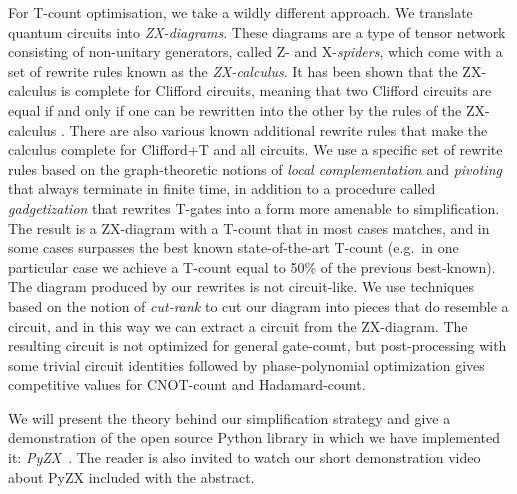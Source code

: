\documentclass[a4paper,11pt]{article}
\begin{document}
For T-count optimisation, we take a wildly different approach. We translate quantum circuits into \emph{ZX-diagrams}. These diagrams are a type of tensor network consisting of non-unitary generators, called Z- and X-\emph{spiders}, which come with a set of rewrite rules known as the \emph{ZX-calculus}. It has been shown that the ZX-calculus is complete for Clifford circuits, meaning that two Clifford circuits are equal if and only if one can be rewritten into the other by the rules of the ZX-calculus \cite{backens2016simplified}. There are also various known additional rewrite rules that make the calculus complete for Clifford+T \cite{jeandel2018complete} and all \cite{HarnyAmarCompleteness} circuits. We use a specific set of rewrite rules based on the graph-theoretic notions of \emph{local complementation} and \emph{pivoting} that always terminate in finite time, in addition to a procedure called \emph{gadgetization} that rewrites T-gates into a form more amenable to simplification. The result is a ZX-diagram with a T-count that in most cases matches, and in some cases surpasses the best known state-of-the-art T-count (e.g.~in one particular case we achieve a T-count equal to 50\% of the previous best-known). The diagram produced by our rewrites is not circuit-like. We use techniques based on the notion of \emph{cut-rank} to cut our diagram into pieces that do resemble a circuit, and in this way we can extract a circuit from the ZX-diagram. The resulting circuit is not optimized for general gate-count, but post-processing with some trivial circuit identities followed by phase-polynomial optimization gives competitive values for CNOT-count and Hadamard-count.

We will present the theory behind our simplification strategy and give a demonstration of the open source Python library in which we have implemented it: \emph{PyZX}~\cite{PyZX}. The reader is also invited to watch our short demonstration video about PyZX included with the abstract.

\newpage



\end{document}
